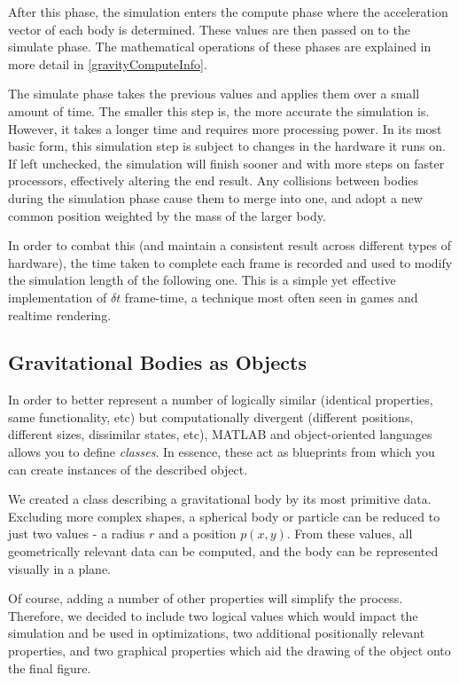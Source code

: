 \documentclass[11pt]{article}
\begin{document}
After this phase, the simulation enters the compute phase where the acceleration vector of each body is determined. These values are then passed on to the simulate phase. The mathematical operations of these phases are  explained in more detail in \ref{gravityComputeInfo}. 

The simulate phase takes the previous values and applies them over a small amount of time. The smaller this step is, the more accurate the simulation is. However, it takes a longer time and requires more processing power. In its most basic form, this simulation step is subject to changes in the hardware it runs on. If left unchecked, the simulation will finish sooner and with more steps on faster processors, effectively altering the end result. Any collisions between bodies during the simulation phase cause them to merge into one, and adopt a new common position weighted by the mass of the larger body.

In order to combat this (and maintain a consistent result across different types of hardware), the time taken to complete each frame is recorded and used to modify the simulation length of the following one. This is a simple yet effective implementation of $\delta t$ frame-time, a technique most often seen in games and realtime rendering.


\subsection{Gravitational Bodies as Objects}
In order to better represent a number of logically similar (identical properties, same functionality, etc) but computationally divergent (different positions, different sizes, dissimilar states, etc), MATLAB and object-oriented languages allows you to define \emph{classes}. In essence, these act as blueprints from which you can create instances of the described object.

We created a class describing a gravitational body by its most primitive data. Excluding more complex shapes, a spherical body or particle can be reduced to just two values - a radius $r$ and a position $p(x, y)$. From these values, all geometrically relevant data can be computed, and the body can be represented visually in a plane.

Of course, adding a number of other properties will simplify the process. Therefore, we decided to include two logical values which would impact the simulation and be used in optimizations, two additional positionally relevant properties, and two graphical properties which aid the drawing of the object onto the final figure.
\end{document}
